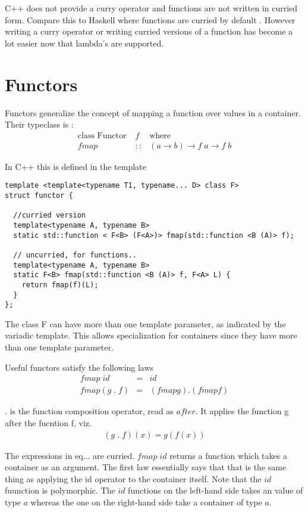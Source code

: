 \documentclass[12pt,fleqn]{article}
\begin{document}
C++ does not provide a curry operator and functions are not written in curried form. 
Compare this to Haskell where functions are curried by default \cite{lipovaca, hutton}.
However writing a curry operator or writing curried versions of a function has become a lot easier now that lambda's are supported.

\section*{Functors}

Functors generalize the concept of mapping a function over values in a container.
Their typeclass is :
\begin{eqnarray*}
\mbox{class Functor}\; &f& \mbox{where} \\
fmap &::& (a \rightarrow b) \rightarrow f\;a \rightarrow f\;b
\end{eqnarray*}

In C++ this is defined in the template 
\begin{lstlisting}
template <template<typename T1, typename... D> class F>
struct functor {

  //curried version
  template<typename A, typename B>
  static std::function < F<B> (F<A>)> fmap(std::function <B (A)> f);

  // uncurried, for functions..
  template<typename A, typename B>
  static F<B> fmap(std::function <B (A)> f, F<A> L) {
    return fmap(f)(L);
  }
};
\end{lstlisting}
The class F can have more than one template parameter, as indicated by the variadic template.
This allows specialization for containers since they have more than one template parameter.

Useful functors satisfy the following laws
\begin{eqnarray*}
fmap \; id &=& id  \\
fmap (g \; . \; f) &=& (fmap g) . (fmap f) 
\end{eqnarray*}

$.$ is the function composition operator, read as $after$. It applies the function g after the fucntion f, viz.
\begin{eqnarray*}
(g \; . \; f)(x) = g(f(x)) 
\end{eqnarray*}

The expressions in eq... are curried.
$fmap \; id$ returns a function which takes a container as an argument. 
The first law essentially says that that is the same thing as applying the id operator to the container itself.
Note that the $id$ fuunction is polymorphic. 
The $id$ functions on the left-hand side takes an value of type $a$ whereas the one on the right-hand side take a container of type $a$.
\end{document}
